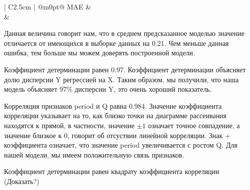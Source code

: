 \documentclass{article}
\begin{document}
\begin{center}
  \begin{tabular}{| C{2.5cm} | @{}m{0pt}@{}}
    \hline
    MAE &\\[0.5em]  &\\[0.5em]   
    \hline
  \end{tabular}
\end{center}

Данная величина говорит нам, что в среднем предсказанное моделью значение отличается от имеющихся в выборке данных на 0.21. Чем меньше данная ошибка, тем больше мы можем доверять построенной модели.

Коэффициент детерминации равен 0.97. Коэффициент детерминации объясняет долю дисперсии Y регрессией на X. Таким образом, мы получили, что наша модель объясняет 97\% дисперсии Y, это очень хороший показатель.

Корреляция признаков period и Q равна 0.984. Значение коэффициента корреляции указывает на то, как близко точки на диаграмме рассеивания находятся к прямой, в частности, значение $\pm 1$ означает точное совпадение, а значение близкое к 0, говорит об отсуствии линейной корреляции. Знак + коэффициента означает, что значение period увеличивается с ростом Q. Для нашей модели, мы имеем положительную связь признаков. 

Коэффициент детерминации равен квадрату коэффициента корреляции (Доказать?)
\end{document}
